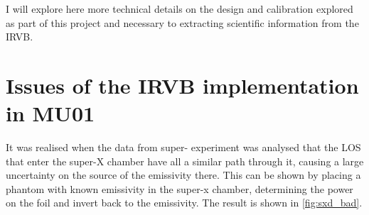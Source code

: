 I will explore here more technical details on the design and calibration explored as part of this project and necessary to extracting scientific information from the IRVB.

\section{Issues of the IRVB implementation in MU01}\label{Issues of the IRVB implementation in MU01}

It was realised when the data from super- experiment was analysed that the LOS that enter the super-X chamber have all a similar path through it, causing a large uncertainty on the source of the emissivity there. This can be shown by placing a phantom with known emissivity in the super-x chamber, determining the power on the foil and invert back to the emissivity. The result is shown in \autoref{fig:sxd_bad}.

